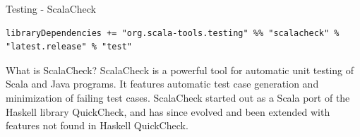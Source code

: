 \begin{frame}[fragile]{Testing - ScalaCheck}
\begin{center}
\end{center}
\begin{lstlisting}[basicstyle=\scriptsize]
libraryDependencies += "org.scala-tools.testing" %% "scalacheck" % "latest.release" % "test"
\end{lstlisting}
\begin{block}{What is ScalaCheck?}
ScalaCheck is a powerful tool for automatic unit testing of Scala and Java
programs. It features automatic test case generation and minimization of failing
test cases. ScalaCheck started out as a Scala port of the Haskell library
QuickCheck, and has since evolved and been extended with features not found in
Haskell QuickCheck.
\end{block}
\end{frame}

